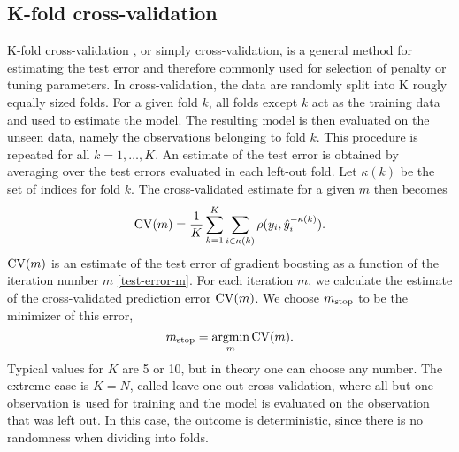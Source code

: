 
\subsection{K-fold cross-validation}\label{subsec:K-fold}
K-fold cross-validation \citep{lachenbruch}, or simply cross-validation, is a general method for estimating the test error and therefore commonly used for selection of penalty or tuning parameters.
In cross-validation, the data are randomly split into K rougly equally sized folds.
For a given fold $k$, all folds except $k$ act as the training data and used to estimate the model.
The resulting model is then evaluated on the unseen data, namely the observations belonging to fold $k$.
This procedure is repeated for all $k=1,\ldots,K$.
An estimate of the test error is obtained by averaging over the test errors evaluated in each left-out fold.
Let $\kappa(k)$ be the set of indices for fold $k$.
The cross-validated estimate for a given $m$ then becomes
\begin{equation*}
    \operatorname{CV}(m)=\frac{1}{K}\sum_{k=1}^K\sum_{i\in\kappa(k)}\rho(y_i,\hat{y}_i^{-\kappa(k)}).
\end{equation*}
$\operatorname{CV}(m)$ is an estimate of the test error of gradient boosting as a function of the iteration number $m$ \eqref{test-error-m}.
For each iteration $m$, we calculate the estimate of the cross-validated prediction error $\operatorname{CV}(m)$.
We choose $m_{\text{stop}}$ to be the minimizer of this error,
\begin{equation*}
    m_{\text{stop}}=\operatorname*{argmin}_{m}\operatorname{CV}(m).
\end{equation*}
Typical values for $K$ are 5 or 10, but in theory one can choose any number. The extreme case is $K=N$, called leave-one-out cross-validation, where all but one observation is used for training and the model is evaluated on the observation that was left out. In this case, the outcome is deterministic, since there is no randomness when dividing into folds.

